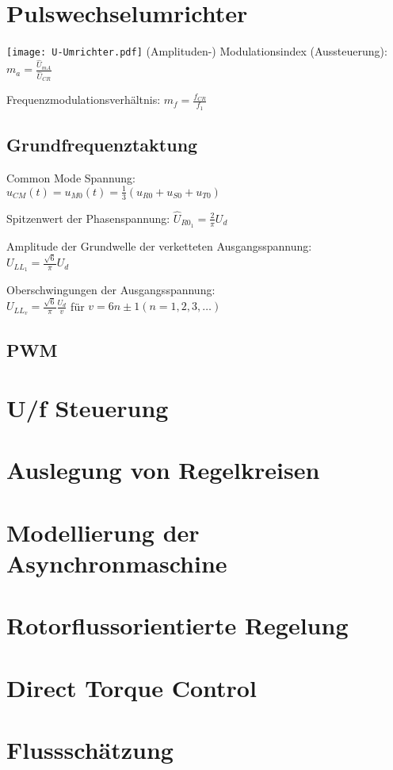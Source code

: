 \documentclass[fs, german]{latex4ei_fs}
\begin{document}
\section{Pulswechselumrichter}
\begin{sectionbox}

\texttt{[image: U-Umrichter.pdf]}
(Amplituden-) Modulationsindex (Aussteuerung): $m_a = \frac{\hat U_{mA}}{\hat U_{CR}}$

Frequenzmodulationsverhältnis: $m_f = \frac{f_{CR}}{f_1}$

\subsection{Grundfrequenztaktung}
Common Mode Spannung: \\
$u_{CM} (t) = u_{M0} (t) = \frac{1}{3} (u_{R0} + u_{S0} + u_{T0})$

Spitzenwert der Phasenspannung:
$\hat U_{R0_1} = \frac{2}{\pi} U_d$


Amplitude der Grundwelle der verketteten Ausgangsspannung: \\
$U_{LL_1} = \frac{\sqrt 6}{\pi} U_d$

Oberschwingungen der Ausgangsspannung: \\
$U_{LL_v} = \frac{\sqrt 6}{\pi} \frac{U_d}{v}$ für $v = 6n \pm 1 (n = 1, 2, 3, \ldots)$
\subsection{PWM}  
\end{sectionbox}

\section{U/f Steuerung}

\section{Auslegung von Regelkreisen}

\section{Modellierung der Asynchronmaschine}

\section{Rotorflussorientierte Regelung} 

\section{Direct Torque Control} 

\section{Flussschätzung} 
\end{document}
